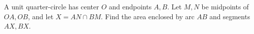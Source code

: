 A unit quarter-circle has center $O$ and endpoints $A,B$. Let $M,N$ be midpoints of $OA,OB$, and let $X=AN\cap BM$. Find the area enclosed by arc $AB$ and segments $AX,BX$.

